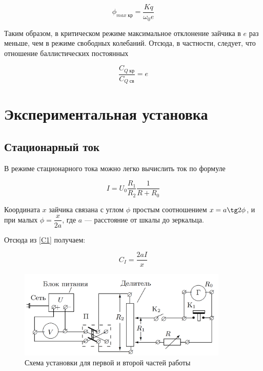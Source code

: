 \documentclass[12pt]{kiarticle} %
\begin{document}
	\begin{equation}\label{}
	\phi_{max \; кр} = \dfrac{Kq}{\omega_0 e}
	\end{equation}
	
	Таким образом, в критическом режиме максимальное отклонение зайчика в $ e $ раз меньше, чем в режиме свободных колебаний. Отсюда, в частности,  следует, что отношение баллистических постоянных
	
	\begin{equation}\label{}
	\dfrac{C_{Q \; кр}}{C_{Q \; св}} = e
	\end{equation}
	
	
	
	\section{Экспериментальная установка}

	\subsection{Стационарный ток}
	
	В режиме стационарного тока можно легко вычислить ток по формуле 
	
	\begin{equation}\label{I}
	I = U_0 \dfrac{R_1}{R_2} \dfrac{1}{R + R_0}
	\end{equation}
	
	Координата $ x $ зайчика связана с углом $ \phi $ простым соотношением $ x = a\tg 2\phi $, и при малых $ \phi  =  \dfrac{x}{2a}$, где $ a $ --- расстояние от шкалы до зеркальца. 
	
	Отсюда из \eqref{C1} получаем:
	
	\begin{equation}\label{C1exp}
	C_I = \dfrac{2aI}{x}
	\end{equation}
	
			\begin{figure} 
		\includegraphics[width=10cm]{scheme1}
		\caption{Схема установки для первой и второй частей работы}
		\label{chain1}
	\end{figure}
	
\end{document}
